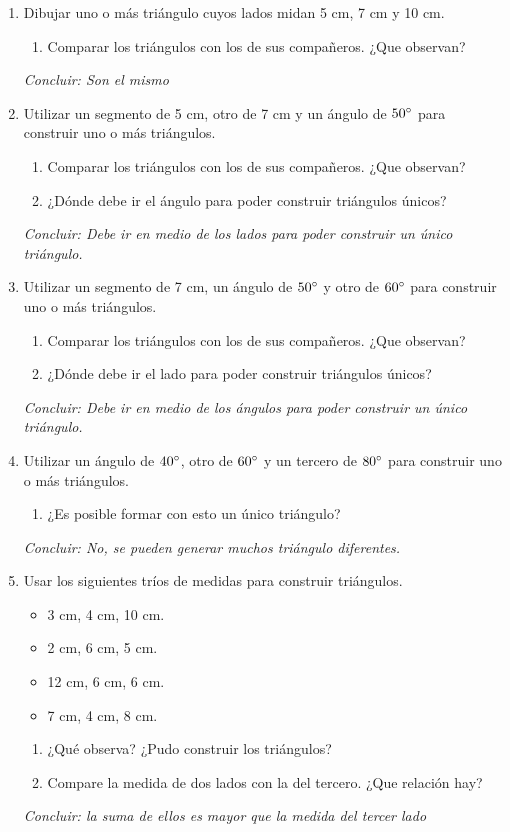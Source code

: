 \begin{enumerate}
	\item Dibujar uno o más triángulo cuyos lados midan 5 cm, 7 cm y 10 cm.
	\begin{enumerate}
		\item Comparar los triángulos con los de sus compañeros. ¿Que observan?
	\end{enumerate}
	\textit{Concluir: Son el mismo}
	\item Utilizar un segmento de 5 cm, otro de 7 cm y un ángulo de $50\degree$ para construir uno o más triángulos. 
	\begin{enumerate}
		\item Comparar los triángulos con los de sus compañeros. ¿Que observan?
		\item ¿Dónde debe ir el ángulo para poder construir triángulos únicos?
	\end{enumerate}
	\textit{Concluir: Debe ir en medio de los lados para poder construir un único triángulo.}
	\item Utilizar un segmento de  7 cm, un ángulo de $50\degree$ y otro de $60\degree$ para construir uno o más triángulos. 
	\begin{enumerate}
		\item Comparar los triángulos con los de sus compañeros. ¿Que observan?
		\item ¿Dónde debe ir el lado para poder construir triángulos únicos?
	\end{enumerate}
	\textit{Concluir: Debe ir en medio de los ángulos para poder construir un único triángulo.}
	\item Utilizar un ángulo de $40\degree$, otro de $60\degree$ y un tercero de $80\degree$ para construir uno o más triángulos. 
	\begin{enumerate}
		\item ¿Es posible formar con esto un único triángulo?
	\end{enumerate}
	\textit{Concluir: No, se pueden generar muchos triángulo diferentes.}
	\item Usar los siguientes tríos de medidas para construir triángulos.
	\begin{itemize}
		\item 3 cm, 4 cm, 10 cm.
		\item 2 cm, 6 cm, 5 cm.
		\item 12 cm, 6 cm, 6 cm.
		\item 7 cm, 4 cm, 8 cm.
	\end{itemize}
	\begin{enumerate}
		\item ¿Qué observa? ¿Pudo construir los triángulos?
		\item Compare la medida de dos lados con la del tercero. ¿Que relación hay?
	\end{enumerate}
	\textit{Concluir: la suma de ellos es mayor que la medida del tercer lado}
	

\end{enumerate}
